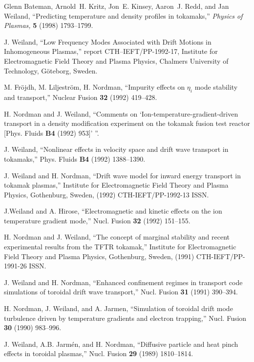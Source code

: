 \begin{thebibliography}{99}

Glenn Bateman, Arnold~H. Kritz, Jon~E. Kinsey, Aaron~J. Redd, and Jan Weiland,
``Predicting temperature and density profiles in tokamaks,''
{\em Physics of Plasmas,} {\bf 5} (1998) 1793--1799.

 J. Weiland,
``Low Frequency Modes Associated with Drift Motions in
Inhomogeneous Plasmas,''
report CTH--IEFT/PP-1992-17,
Institute for Electromagnetic Field Theory and Plasma Physics,
Chalmers University of Technology,
G\"{o}teborg, Sweden.

 M. Fr\"{o}jdh, M. Liljestr\"{o}m, H. Nordman,
``Impurity effects on $\eta_i$ mode stability and transport,''
Nuclear Fusion {\bf 32} (1992) 419--428.

 H. Nordman and J. Weiland, ``Comments on
`Ion-temperature-gradient-driven 
transport in a density modification experiment on the tokamak fusion test
reactor [Phys. Fluids {\bf B4} (1992) 953]' ''.

 J. Weiland, 
``Nonlinear effects in velocity space and drift wave
transport in tokamaks,'' Phys. Fluids {\bf B4} (1992) 1388--1390.

 J. Weiland and H. Nordman, ``Drift wave model for inward
energy transport in tokamak plasmas,'' Institute for Electromagnetic Field
Theory and Plasma Physics, Gothenburg, Sweden, (1992) CTH-IEFT/PP-1992-13 ISSN.

 J.Weiland and A. Hirose, ``Electromagnetic and kinetic
effects on the ion temperature gradient mode,'' Nucl. Fusion {\bf 32} (1992)
151--155.

 H. Nordman and J. Weiland, ``The concept of marginal
stability and recent experimental results from the TFTR tokamak,'' Institute
for Electromagnetic Field Theory and Plasma Physics, Gothenburg, Sweden, (1991)
CTH-IEFT/PP-1991-26 ISSN.

 J. Weiland and H. Nordman, ``Enhanced confinement regimes in
transport code simulations of toroidal drift wave transport,'' Nucl. Fusion
{\bf 31} (1991) 390--394.

 H. Nordman, J. Weiland, and A. Jarmen, ``Simulation of
toroidal drift mode turbulence driven by temperature gradients and electron
trapping,'' Nucl. Fusion {\bf 30} (1990) 983--996.

 J. Weiland, A.B. Jarm\'{e}n, and H. Nordman, ``Diffusive
particle and heat pinch effects in toroidal plasmas,'' Nucl. Fusion {\bf 29}
(1989) 1810--1814.


\end{thebibliography}
